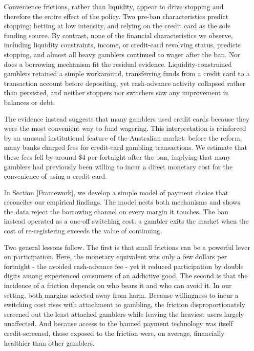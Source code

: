 \documentclass[11pt]{article}
\begin{document}
Convenience frictions, rather than liquidity, appear to drive stopping and therefore the entire effect of the policy. Two pre-ban characteristics predict stopping: betting at low intensity, and relying on the credit card as the sole funding source. By contrast, none of the financial characteristics we observe, including liquidity constraints, income, or credit-card revolving status, predicts stopping, and almost all heavy gamblers continued to wager after the ban. Nor does a borrowing mechanism fit the residual evidence. Liquidity-constrained gamblers retained a simple workaround, transferring funds from a credit card to a transaction account before depositing, yet cash-advance activity collapsed rather than persisted, and neither stoppers nor switchers saw any improvement in balances or debt.

The evidence instead suggests that many gamblers used credit cards because they were the most convenient way to fund wagering. This interpretation is reinforced by an unusual institutional feature of the Australian market: before the reform, many banks charged fees for credit-card gambling transactions. We estimate that these fees fell by around \$4 per fortnight after the ban, implying that many gamblers had previously been willing to incur a direct monetary cost for the convenience of using a credit card.

In Section \ref{Framework}, we develop a simple model of payment choice that reconciles our empirical findings. The model nests both mechanisms and shows the data reject the borrowing channel on every margin it touches. The ban instead operated as a one-off switching cost: a gambler exits the market when the cost of re-registering exceeds the value of continuing.

Two general lessons follow. The first is that small frictions can be a powerful lever on participation. Here, the monetary equivalent was only a few dollars per fortnight - the avoided cash-advance fee - yet it reduced participation by double digits among experienced consumers of an addictive good. The second is that the incidence of a friction depends on who bears it and who can avoid it. In our setting, both margins selected away from harm. Because willingness to incur a switching cost rises with attachment to gambling, the friction disproportionately screened out the least attached gamblers while leaving the heaviest users largely unaffected. And because access to the banned payment technology was itself credit-screened, those exposed to the friction were, on average, financially healthier than other gamblers.
\end{document}
